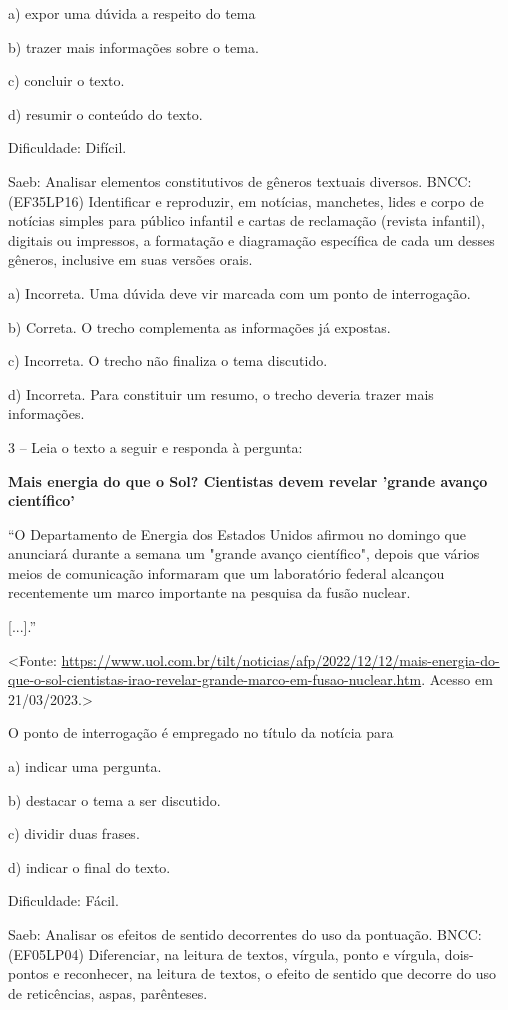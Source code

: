 a) expor uma dúvida a respeito do tema

b) trazer mais informações sobre o tema.

c) concluir o texto.

d) resumir o conteúdo do texto.

Dificuldade: Difícil.

Saeb: Analisar elementos constitutivos de gêneros textuais diversos.
BNCC: (EF35LP16) Identificar e reproduzir, em notícias, manchetes, lides
e corpo de notícias simples para público infantil e cartas de reclamação
(revista infantil), digitais ou impressos, a formatação e diagramação
específica de cada um desses gêneros, inclusive em suas versões orais.

a) Incorreta. Uma dúvida deve vir marcada com um ponto de interrogação.

b) Correta. O trecho complementa as informações já expostas.

c) Incorreta. O trecho não finaliza o tema discutido.

d) Incorreta. Para constituir um resumo, o trecho deveria trazer mais
informações.

3 -- Leia o texto a seguir e responda à pergunta:

\textbf{Mais energia do que o Sol? Cientistas devem revelar 'grande
avanço científico'}

``O Departamento de Energia dos Estados Unidos afirmou no domingo que
anunciará durante a semana um "grande avanço científico", depois que
vários meios de comunicação informaram que um laboratório federal
alcançou recentemente um marco importante na pesquisa da fusão nuclear.

{[}...{]}.''

\textless{}Fonte:
\url{https://www.uol.com.br/tilt/noticias/afp/2022/12/12/mais-energia-do-que-o-sol-cientistas-irao-revelar-grande-marco-em-fusao-nuclear.htm}.
Acesso em 21/03/2023.\textgreater{}

O ponto de interrogação é empregado no título da notícia para

a) indicar uma pergunta.

b) destacar o tema a ser discutido.

c) dividir duas frases.

d) indicar o final do texto.

Dificuldade: Fácil.

Saeb: Analisar os efeitos de sentido decorrentes do uso da pontuação.
BNCC: (EF05LP04) Diferenciar, na leitura de textos, vírgula, ponto e
vírgula, dois-pontos e reconhecer, na leitura de textos, o efeito de
sentido que decorre do uso de reticências, aspas, parênteses.

